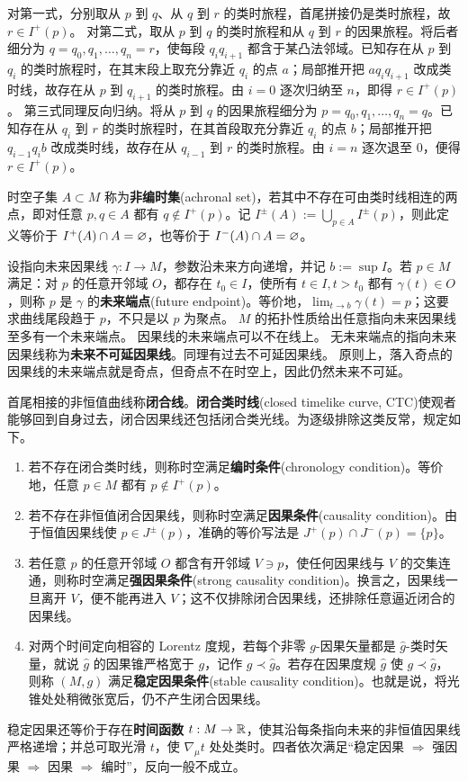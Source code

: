 对第一式，分别取从 $p$ 到 $q$、从 $q$ 到 $r$ 的类时旅程，首尾拼接仍是类时旅程，故 $r\in I^+(p)$。
对第二式，取从 $p$ 到 $q$ 的类时旅程和从 $q$ 到 $r$ 的因果旅程。将后者细分为 $q=q_0,q_1,\ldots,q_n=r$，使每段 $q_iq_{i+1}$ 都含于某凸法邻域。已知存在从 $p$ 到 $q_i$ 的类时旅程时，在其末段上取充分靠近 $q_i$ 的点 $a$；局部推开把 $aq_iq_{i+1}$ 改成类时线，故存在从 $p$ 到 $q_{i+1}$ 的类时旅程。由 $i=0$ 逐次归纳至 $n$，即得 $r\in I^+(p)$。
第三式同理反向归纳。将从 $p$ 到 $q$ 的因果旅程细分为 $p=q_0,q_1,\ldots,q_n=q$。已知存在从 $q_i$ 到 $r$ 的类时旅程时，在其首段取充分靠近 $q_i$ 的点 $b$；局部推开把 $q_{i-1}q_ib$ 改成类时线，故存在从 $q_{i-1}$ 到 $r$ 的类时旅程。由 $i=n$ 逐次退至 $0$，便得 $r\in I^+(p)$。

时空子集 $A\subset M$ 称为\textbf{非编时集}(achronal set)，若其中不存在可由类时线相连的两点，即对任意 $p,q\in A$ 都有 $q\notin I^+(p)$。记 $I^\pm(A):=\bigcup_{p\in A}I^\pm(p)$，则此定义等价于 $I^+(A)\cap A=\varnothing$，也等价于 $I^-(A)\cap A=\varnothing$。

设指向未来因果线 $\gamma:I\to M$，参数沿未来方向递增，并记 $b:=\sup I$。若 $p\in M$ 满足：对 $p$ 的任意开邻域 $O$，都存在 $t_0\in I$，使所有 $t\in I,t>t_0$ 都有 $\gamma(t)\in O$，则称 $p$ 是 $\gamma$ 的\textbf{未来端点}(future endpoint)。等价地，$\lim_{t\to b}\gamma(t)=p$；这要求曲线尾段趋于 $p$，不只是以 $p$ 为聚点。
$M$ 的拓扑性质给出任意指向未来因果线至多有一个未来端点。
因果线的未来端点可以不在线上。
无未来端点的指向未来因果线称为\textbf{未来不可延因果线}。同理有过去不可延因果线。
原则上，落入奇点的因果线的未来端点就是奇点，但奇点不在时空上，因此仍然未来不可延。

首尾相接的非恒值曲线称\textbf{闭合线}。\textbf{闭合类时线}(closed timelike curve, CTC)使观者能够回到自身过去，闭合因果线还包括闭合类光线。为逐级排除这类反常，规定如下。
\begin{enumerate}
    \item 若不存在闭合类时线，则称时空满足\textbf{编时条件}(chronology condition)。等价地，任意 $p\in M$ 都有 $p\notin I^+(p)$。
    \item 若不存在非恒值闭合因果线，则称时空满足\textbf{因果条件}(causality condition)。由于恒值因果线使 $p\in J^\pm(p)$，准确的等价写法是 $J^+(p)\cap J^-(p)=\{p\}$。
    \item 若任意 $p$ 的任意开邻域 $O$ 都含有开邻域 $V\ni p$，使任何因果线与 $V$ 的交集连通，则称时空满足\textbf{强因果条件}(strong causality condition)。换言之，因果线一旦离开 $V$，便不能再进入 $V$；这不仅排除闭合因果线，还排除任意逼近闭合的因果线。
    \item 对两个时间定向相容的 Lorentz 度规，若每个非零 $g$-因果矢量都是 $\hat g$-类时矢量，就说 $\hat g$ 的因果锥严格宽于 $g$，记作 $g\prec\hat g$。若存在因果度规 $\hat g$ 使 $g\prec\hat g$，则称 $(M,g)$ 满足\textbf{稳定因果条件}(stable causality condition)。也就是说，将光锥处处稍微张宽后，仍不产生闭合因果线。
\end{enumerate}
稳定因果还等价于存在\textbf{时间函数} $t:M\to\mathbb{R}$，使其沿每条指向未来的非恒值因果线严格递增；并总可取光滑 $t$，使 $\nabla_\mu t$ 处处类时。四者依次满足“稳定因果 $\Rightarrow$ 强因果 $\Rightarrow$ 因果 $\Rightarrow$ 编时”，反向一般不成立。


